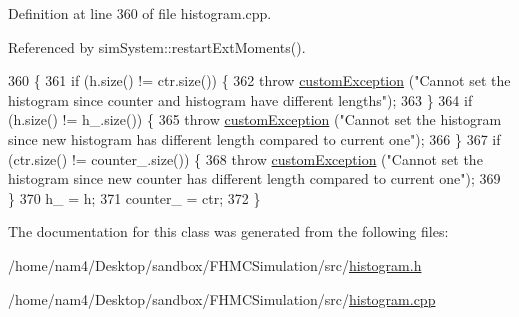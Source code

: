 Definition at line 360 of file histogram.\-cpp.



Referenced by sim\-System\-::restart\-Ext\-Moments().


\begin{DoxyCode}
360                                                                                \{
361     \textcolor{keywordflow}{if} (h.size() != ctr.size()) \{
362         \textcolor{keywordflow}{throw} \hyperlink{classcustom_exception}{customException} (\textcolor{stringliteral}{"Cannot set the histogram since counter and histogram have
       different lengths"});
363     \}
364     \textcolor{keywordflow}{if} (h.size() != h\_.size()) \{
365         \textcolor{keywordflow}{throw} \hyperlink{classcustom_exception}{customException} (\textcolor{stringliteral}{"Cannot set the histogram since new histogram has different
       length compared to current one"});
366     \}
367     \textcolor{keywordflow}{if} (ctr.size() != counter\_.size()) \{
368         \textcolor{keywordflow}{throw} \hyperlink{classcustom_exception}{customException} (\textcolor{stringliteral}{"Cannot set the histogram since new counter has different
       length compared to current one"});
369     \}
370     h\_ = h;
371     counter\_ = ctr;
372 \}
\end{DoxyCode}


The documentation for this class was generated from the following files\-:\begin{DoxyCompactItemize}
\item 
/home/nam4/\-Desktop/sandbox/\-F\-H\-M\-C\-Simulation/src/\hyperlink{histogram_8h}{histogram.\-h}\item 
/home/nam4/\-Desktop/sandbox/\-F\-H\-M\-C\-Simulation/src/\hyperlink{histogram_8cpp}{histogram.\-cpp}\end{DoxyCompactItemize}
